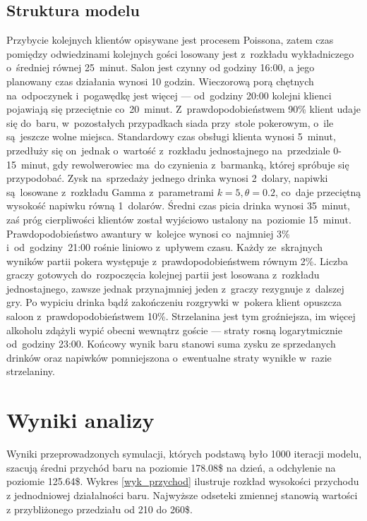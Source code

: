 \documentclass[12pt, a4paper, oneside]{mwart} %
\begin{document}
\subsection{Struktura modelu}
Przybycie kolejnych klientów opisywane jest procesem Poissona, zatem czas pomiędzy odwiedzinami kolejnych gości losowany jest z~rozkładu wykładniczego o~średniej równej 25~minut. Salon jest czynny od godziny 16:00, a jego planowany czas działania wynosi 10 godzin. Wieczorową porą chętnych na~odpoczynek i~pogawędkę jest więcej --- od~godziny 20:00 kolejni klienci pojawiają się przeciętnie co~20~minut. Z~prawdopodobieństwem 90\% klient udaje się do~baru, w~pozostałych przypadkach siada przy~stole pokerowym, o~ile są~jeszcze wolne miejsca. Standardowy czas obsługi klienta wynosi 5~minut, przedłuży się on~jednak o~wartość z~rozkładu jednostajnego na~przedziale 0-15~minut, gdy rewolwerowiec ma~do czynienia z~barmanką, której spróbuje się przypodobać. Zysk na~sprzedaży jednego drinka wynosi 2~dolary, napiwki są~losowane z~rozkładu Gamma z~parametrami $k = 5, \theta = 0.2$, co~daje przeciętną wysokość napiwku równą 1~dolarów. Średni czas picia drinka wynosi 35~minut, zaś próg cierpliwości klientów został wyjściowo ustalony na~poziomie 15~minut. Prawdopodobieństwo awantury w~kolejce wynosi co~najmniej 3\% i~od~godziny~21:00 rośnie liniowo z~upływem czasu. Każdy ze~skrajnych wyników partii pokera występuje z~prawdopodobieństwem równym 2\%. Liczba graczy gotowych do~rozpoczęcia kolejnej partii jest losowana z~rozkładu jednostajnego, zawsze jednak przynajmniej jeden z~graczy rezygnuje z~dalszej gry. Po wypiciu drinka bądź zakończeniu rozgrywki w~pokera klient opuszcza saloon z~prawdopodobieństwem 10\%. Strzelanina jest tym groźniejsza, im więcej alkoholu zdążyli wypić obecni wewnątrz goście --- straty rosną logarytmicznie od~godziny 23:00. Końcowy wynik baru stanowi suma zysku ze sprzedanych drinków oraz napiwków pomniejszona o~ewentualne straty wynikłe w~razie strzelaniny.

\section{Wyniki analizy}
Wyniki przeprowadzonych symulacji, których podstawą było 1000 iteracji modelu, szacują średni przychód baru na poziomie 178.08\$ na dzień, a odchylenie na poziomie 125.64\$. Wykres \ref{wyk_przychod} ilustruje rozkład wysokości przychodu z jednodniowej działalności baru. Najwyższe odseteki zmiennej stanowią wartości z przybliżonego przedziału od 210 do 260\$.
\end{document}
